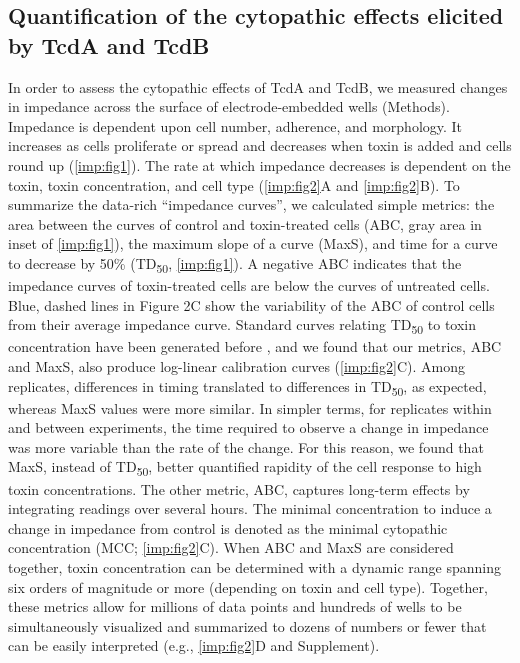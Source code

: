 \subsection{Quantification of the cytopathic effects 
              elicited by TcdA and TcdB}
In order to assess the cytopathic effects of TcdA and TcdB, 
we measured changes in impedance across the surface of 
electrode-embedded wells (Methods). Impedance is dependent 
upon cell number, adherence, and morphology. It increases 
as cells proliferate or spread and decreases when toxin is 
added and cells round up (\autoref{imp:fig1}). The rate at which impedance 
decreases is dependent on the toxin, toxin concentration, and cell 
type (\autoref{imp:fig2}A and \autoref{imp:fig2}B). To summarize the data-rich 
``impedance curves'', we calculated simple metrics: the 
area between the curves of control and toxin-treated cells 
(ABC, gray area in inset of \autoref{imp:fig1}), the maximum slope of 
a curve (MaxS), and time for a curve to decrease by 50\% (TD\textsubscript{50}, 
\autoref{imp:fig1}). A negative ABC indicates that the impedance curves 
of toxin-treated cells are below the curves of untreated 
cells. Blue, dashed lines in Figure 2C show the variability 
of the ABC of control cells from their average impedance 
curve. Standard curves relating TD\textsubscript{50} to toxin concentration 
have been generated before \cite{Xu:2012db}, and we found that our 
metrics, ABC and MaxS, also produce log-linear calibration 
curves (\autoref{imp:fig2}C). Among replicates, differences in 
timing translated to differences in TD\textsubscript{50}, as expected, 
whereas MaxS values were more similar. In simpler terms, 
for replicates within and between experiments, the time 
required to observe a change in impedance was more 
variable than the rate of the change. For this reason, 
we found that MaxS, instead of TD\textsubscript{50}, better quantified 
rapidity of the cell response to high toxin concentrations. 
The other metric, ABC, captures long-term effects by 
integrating readings over several hours. The minimal 
concentration to induce a change in impedance from control 
is denoted as the minimal cytopathic concentration 
(MCC; \autoref{imp:fig2}C). When ABC and MaxS are considered together, 
toxin concentration can be determined with a dynamic 
range spanning six orders of magnitude or more (depending 
on toxin and cell type). Together, these metrics allow 
for millions of data points and hundreds of wells to be 
simultaneously visualized and summarized to dozens of numbers 
or fewer that can be easily interpreted (e.g., \autoref{imp:fig2}D 
and Supplement).

